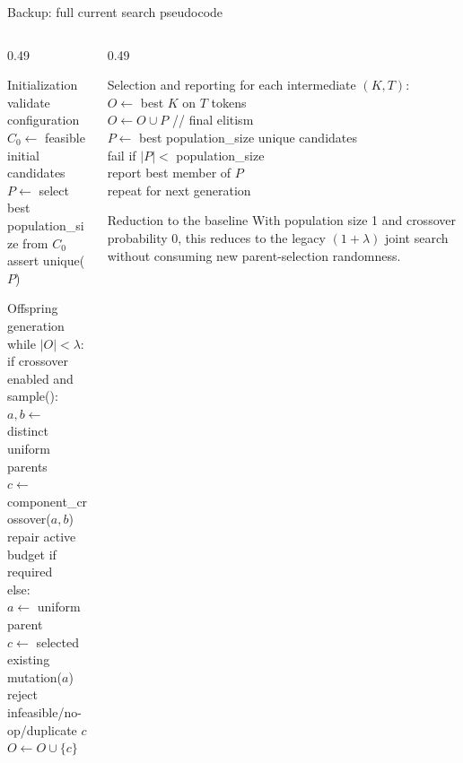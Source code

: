 \documentclass[aspectratio=169,10pt]{beamer}
\begin{document}
\begin{frame}{Backup: full current search pseudocode}
\scriptsize
\begin{columns}[T,onlytextwidth]
\begin{column}{0.49\textwidth}
\begin{block}{Initialization}
\ttfamily
validate configuration\\
$C_0 \leftarrow$ feasible initial candidates\\
$P \leftarrow$ select best population\_size from $C_0$\\
assert unique($P$)
\end{block}

\begin{block}{Offspring generation}
\ttfamily
while $|O| < \lambda$:\\
\quad if crossover enabled and sample():\\
\qquad $a,b\leftarrow$ distinct uniform parents\\
\qquad $c\leftarrow$ component\_crossover($a,b$)\\
\qquad repair active budget if required\\
\quad else:\\
\qquad $a\leftarrow$ uniform parent\\
\qquad $c\leftarrow$ selected existing mutation($a$)\\
\quad reject infeasible/no-op/duplicate $c$\\
\quad $O\leftarrow O\cup\{c\}$
\end{block}
\end{column}
\begin{column}{0.49\textwidth}
\begin{block}{Selection and reporting}
\ttfamily
for each intermediate $(K,T)$:\\
\quad $O\leftarrow$ best $K$ on $T$ tokens\\[0.15cm]
$O\leftarrow O\cup P$ \quad // final elitism\\
$P\leftarrow$ best population\_size unique candidates\\
fail if $|P|<$ population\_size\\
report best member of $P$\\
repeat for next generation
\end{block}

\begin{alertblock}{Reduction to the baseline}
With population size 1 and crossover probability 0, this reduces to the legacy $(1+\lambda)$ joint search without consuming new parent-selection randomness.
\end{alertblock}
\end{column}
\end{columns}
\end{frame}
\end{document}
